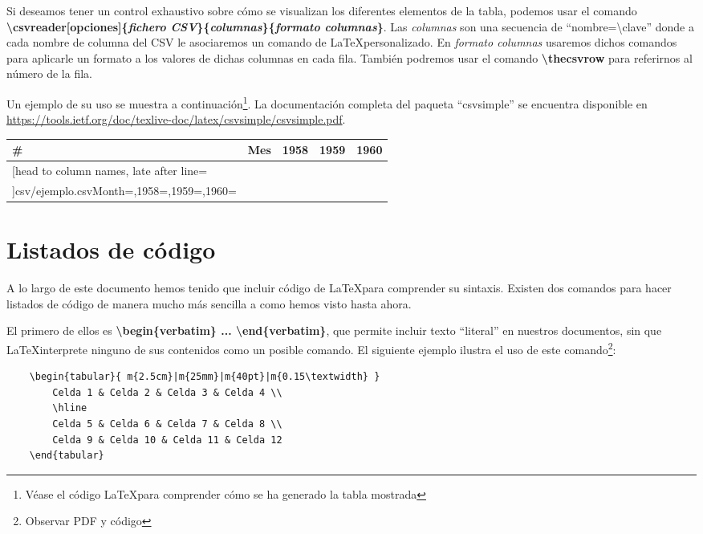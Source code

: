 
Si deseamos tener un control exhaustivo sobre cómo se visualizan los diferentes elementos de la tabla, podemos usar el comando \textbf{\textbackslash csvreader[opciones]\{\emph{fichero CSV}\}\{\emph{columnas}\}\{\emph{formato columnas}\}}. Las \emph{columnas} son una secuencia de ``nombre=\textbackslash clave'' donde a cada nombre de columna del CSV le asociaremos un comando de \LaTeX personalizado. En \emph{formato columnas} usaremos dichos comandos para aplicarle un formato a los valores de dichas columnas en cada fila. También podremos usar el comando \textbf{\textbackslash thecsvrow} para referirnos al número de la fila.

Un ejemplo de su uso se muestra a continuación\footnote{Véase el código \LaTeX para comprender cómo se ha generado la tabla mostrada}. La documentación completa del paqueta ``csvsimple'' se encuentra disponible en \url{https://tools.ietf.org/doc/texlive-doc/latex/csvsimple/csvsimple.pdf}.

\begin{tabular}{l|l||c|c|c}
	\hline
	\textbf{\#} & \textbf{Mes} & \textbf{1958} & \textbf{1959} & \textbf{1960}\\
	\hline
	\csvreader[head to column names, late after line=\\\hline]{csv/ejemplo.csv}{Month=\month,1958=\anhoA,1959=\anhoB,1960=\anhoC}{\textbf{\thecsvrow} & \month & \emph{\anhoA} & \emph{\anhoB} & \emph{\anhoC}}
 \end{tabular}
 
\section{Listados de código}

A lo largo de este documento hemos tenido que incluir código de \LaTeX para comprender su sintaxis. Existen dos comandos para hacer listados de código de manera mucho más sencilla a como hemos visto hasta ahora.

El primero de ellos es \textbf{\textbackslash begin\{verbatim\} ... \textbackslash end\{verbatim\}}, que permite incluir texto ``literal'' en nuestros documentos, sin que \LaTeX interprete ninguno de sus contenidos como un posible comando. El siguiente ejemplo ilustra el uso de este comando\footnote{Observar PDF y código}:

\begin{verbatim}
	\begin{tabular}{ m{2.5cm}|m{25mm}|m{40pt}|m{0.15\textwidth} }
 		Celda 1 & Celda 2 & Celda 3 & Celda 4 \\
 		\hline
 		Celda 5 & Celda 6 & Celda 7 & Celda 8 \\  
 		Celda 9 & Celda 10 & Celda 11 & Celda 12   
	\end{tabular}
\end{verbatim}

